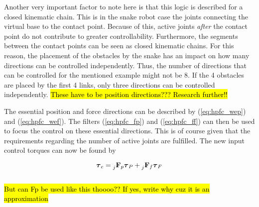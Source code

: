Another very important factor to note here is that this logic is described for a closed kinematic chain. This is in the snake robot case the joints connecting the virtual base to the contact point. Because of this, active joints \textit{after} the contact point do not contribute to greater controllability. Furthermore, the segments between the contact points can be seen as closed kinematic chains. For this reason, the placement of the obstacles by the snake has an impact on how many directions can be controlled independently. Thus, the number of directions that can be controlled for the mentioned example might not be 8. If the 4 obstacles are placed by the first 4 links, only three directions can be controlled independently. \hl{These have to be position directions??? Research further!!}

The essential position and force directions can be described by (\ref{eq:hpfc_wep}) and (\ref{eq:hpfc_wef}). The filters (\ref{eq:hpfc_fp}) and (\ref{eq:hpfc_ff}) can then be used to focus the control on these essential directions. This is of course given that the requirements regarding the number of active joints are fulfilled. The new input control torques can now be found by

\begin{equation}
    \boldsymbol{\tau}_c = \prescript{}{j}{\mathbf{F}}_{p} \boldsymbol{\tau}_P + \prescript{}{j}{\mathbf{F}}_{f} \boldsymbol{\tau}_F
\end{equation}
\\
\hl{But can Fp be used like this thoooo?? If yes, write why cuz it is an approximation}
